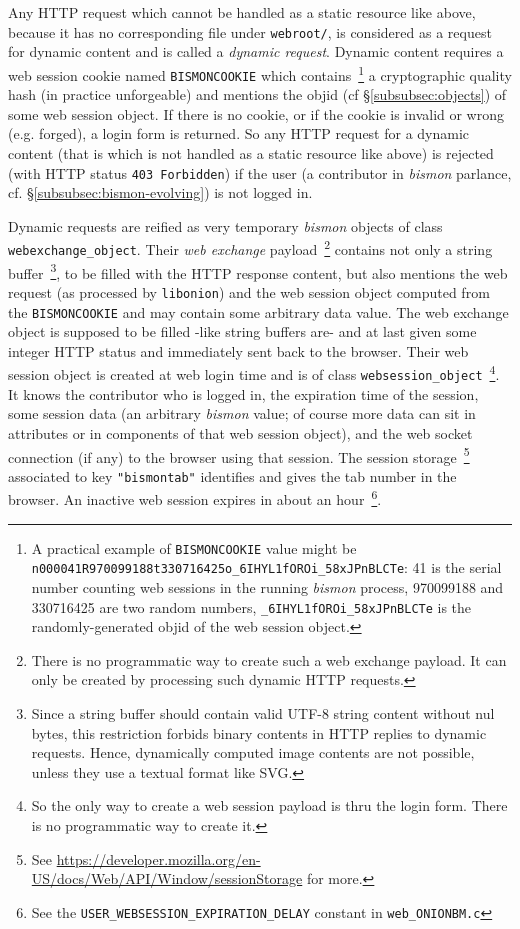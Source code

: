Any HTTP request which cannot be handled as a static resource like
above, because it has no corresponding file under \texttt{webroot/},
is considered as a request for dynamic content and is called a
  \emph{dynamic
  request}. Dynamic content requires a web session 
 cookie  
named \texttt{BISMONCOOKIE} which contains~\footnote{A practical
  example of \texttt{BISMONCOOKIE} value might be
  \texttt{n000041R970099188t330716425o\_6IHYL1fOROi\_58xJPnBLCTe}: 41
  is the serial number counting web sessions in the running
  \emph{bismon} process, 970099188 and 330716425 are two random
  numbers, \texttt{\_6IHYL1fOROi\_58xJPnBLCTe} is the
  randomly-generated objid of the web session object.} a cryptographic
quality hash (in practice unforgeable) and mentions the objid
 (cf §\ref{subsubsec:objects}) of some web session
object. If there is no cookie, or if the  cookie is
invalid or wrong (e.g. forged), a login  form is
returned. So any HTTP request for a dynamic content (that is which is
not handled as a static resource like above) is rejected (with HTTP
status \texttt{403 Forbidden}) if the user (a 
contributor in \emph{bismon} parlance,
cf. §\ref{subsubsec:bismon-evolving}) is not logged in.

Dynamic requests are reified as very temporary \emph{bismon} objects
of class \texttt{webexchange\_object}. Their \emph{web exchange}
payload~\footnote{There is no programmatic way to create such a web
  exchange payload. It can only be created by processing such dynamic
  HTTP requests.} contains not only a string buffer~\footnote{Since a
  string buffer should contain valid UTF-8 string content without nul
  bytes, this restriction forbids binary contents in HTTP replies to
  dynamic requests. Hence, dynamically computed image contents are not
  possible, unless they use a textual format like SVG.}, to be filled
with the HTTP response content, but also mentions the web request (as
processed by \texttt{libonion}) and the web session object computed
from the \texttt{BISMONCOOKIE} and may contain some arbitrary data
value. The web exchange object is supposed to be filled -like string
buffers are- and at last given some integer HTTP status and
immediately sent back to the browser.  Their web session object is
created at web login time and is of class
\texttt{websession\_object}~\footnote{So the only way to create a web
  session payload is thru the login form. There is no programmatic way
  to create it.}. It knows the contributor who is logged in, the
expiration time of the session, some session data (an arbitrary
\emph{bismon} value; of course more data can sit in attributes or in
components of that web session object), and the web socket  connection (if any) to the browser using that session. The
session storage~\footnote{See
  \url{https://developer.mozilla.org/en-US/docs/Web/API/Window/sessionStorage}
  for more.} associated to key \texttt{"bismontab"} identifies and
gives the tab number in the browser. An inactive web session expires
in about an hour~\footnote{See the
  \texttt{USER\_WEBSESSION\_EXPIRATION\_DELAY} constant in
  \texttt{web\_ONIONBM.c}}.

